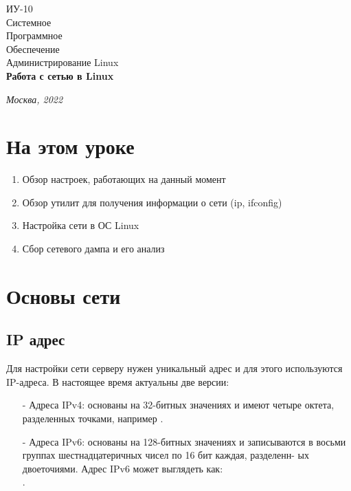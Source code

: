 \documentclass[14pt, a4paper]{article}
\begin{document}
\begin{titlepage}
    \topmargin=216pt
    \newpage
    \hangindent=0.7cm
    \huge ИУ-10\\
    Системное\\
    Программное\\
    Обеспечение\\
    Администрирование Linux\\
    \textbf{Работа с сетью в Linux}

    \vspace{10cm}

    \begin{center}
        \small\textit{Москва, 2022}
    \end{center}
\end{titlepage}

\section*{На этом уроке} 

\begin{enumerate}
    \item Обзор настроек, работающих на данный момент
    \item Обзор утилит для получения информации о сети (ip, ifconfig)
    \item Настройка сети в ОС Linux
    \item Сбор сетевого дампа и его анализ
\end{enumerate}

\tableofcontents
\newpage

\section*{Основы сети} 

\subsection*{IP адрес} 

Для настройки сети серверу нужен уникальный адрес и для этого используются IP-адреса. В
настоящее время актуальны две версии:
\begin{itemize}
    \item[-] Адреса IPv4: основаны на 32-битных значениях и имеют четыре октета, разделенных точками,
    например .
    \item[-] Адреса IPv6: основаны на 128-битных значениях и записываются в восьми группах
    шестнадцатеричных чисел по 16 бит каждая, разделенн- 
    ых двоеточиями. Адрес IPv6 может выглядеть как:\\
    .
\end{itemize}
\end{document}
